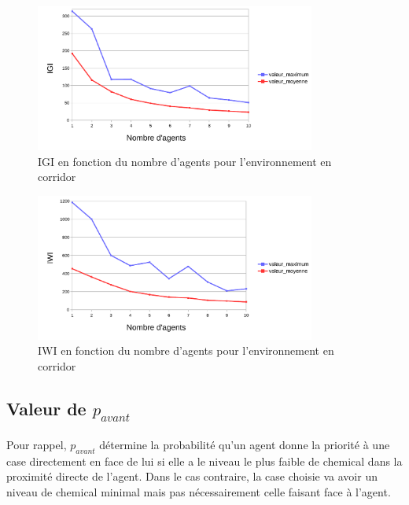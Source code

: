 \documentclass{article}
\begin{document}
            \begin{figure}[!h]
                \begin{center}
                    \includegraphics[width = 0.82\textwidth]{graphes pdf/variance tortues IGI corridor.pdf}
                    \caption{IGI en fonction du nombre d'agents pour l'environnement en corridor}
                \end{center}
            \end{figure}
            \begin{figure}[!h]
                \begin{center}
                    \includegraphics[width = 0.82\textwidth]{graphes pdf/variance tortues IWI corridor.pdf}
                    \caption{IWI en fonction du nombre d'agents pour l'environnement en corridor}
                \end{center}
            \end{figure}
            \newpage
    \subsection{Valeur de \texorpdfstring{$p_{avant}$}{p\_avant}}
    \paragraph{}Pour rappel, $p_{avant}$ détermine la probabilité qu'un agent donne la priorité à une case directement en face de lui si elle a le niveau le plus faible de chemical dans la proximité directe de l'agent.
    Dans le cas contraire, la case choisie va avoir un niveau de chemical minimal mais pas nécessairement celle faisant face à l'agent. 
\end{document}
